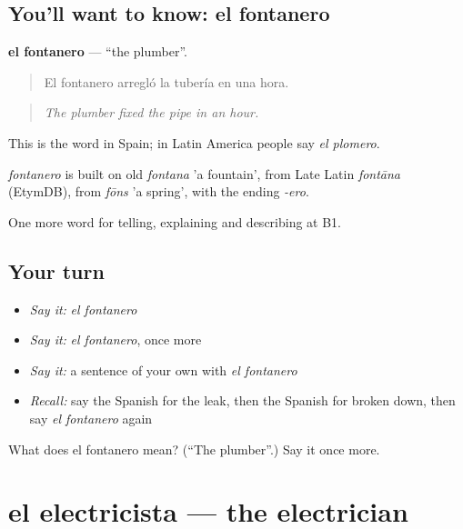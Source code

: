 \subsection*{You'll want to know: el fontanero}
\textbf{el fontanero} — \textquotedblleft{}the plumber\textquotedblright{}.

\begin{quote}
El fontanero arregló la tubería en una hora.
\end{quote}

\begin{quote}
\emph{The plumber fixed the pipe in an hour.}
\end{quote}

This is the word in Spain; in Latin America people say \emph{el plomero}.

\begin{cousinweb}
\emph{fontanero} is built on old \emph{fontana} 'a fountain', from Late Latin \emph{fontāna} (EtymDB), from \emph{fōns} 'a spring', with the ending \emph{-ero}.
\end{cousinweb}

\begin{grammarlens}[title={What you've built}]
One more word for telling, explaining and describing at B1.
\end{grammarlens}

\subsection*{Your turn}
\begin{itemize}
\raggedright
  \item \emph{Say it:} \emph{el fontanero}
  \item \emph{Say it:} \emph{el fontanero}, once more
  \item \emph{Say it:} a sentence of your own with \emph{el fontanero}
  \item \emph{Recall:} say the Spanish for the leak, then the Spanish for broken down, then say \emph{el fontanero} again
\end{itemize}

\begin{tcolorbox}[breakable,colback=teal!4,colframe=teal!35!black,title={Before you move on}]
What does el fontanero mean? (\textquotedblleft{}The plumber\textquotedblright{}.) Say it once more.
\end{tcolorbox}
\section[el electricista]{el electricista — the electrician}


